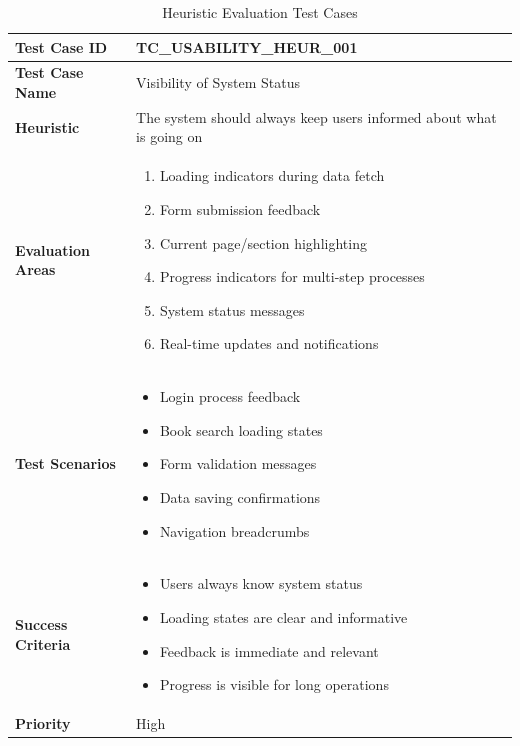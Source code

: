 \documentclass[12pt,a4paper]{article}
\begin{document}
\begin{longtable}{|p{3cm}|p{12cm}|}
\caption{Heuristic Evaluation Test Cases} \\
\hline
\rowcolor{lightgray}
\textbf{Test Case ID} & \textbf{TC\_USABILITY\_HEUR\_001} \\
\hline
\textbf{Test Case Name} & Visibility of System Status \\
\hline
\textbf{Heuristic} & The system should always keep users informed about what is going on \\
\hline
\textbf{Evaluation Areas} & 
\begin{enumerate}[nosep]
    \item Loading indicators during data fetch
    \item Form submission feedback
    \item Current page/section highlighting
    \item Progress indicators for multi-step processes
    \item System status messages
    \item Real-time updates and notifications
\end{enumerate} \\
\hline
\textbf{Test Scenarios} & 
\begin{itemize}[nosep]
    \item Login process feedback
    \item Book search loading states
    \item Form validation messages
    \item Data saving confirmations
    \item Navigation breadcrumbs
\end{itemize} \\
\hline
\textbf{Success Criteria} & 
\begin{itemize}[nosep]
    \item Users always know system status
    \item Loading states are clear and informative
    \item Feedback is immediate and relevant
    \item Progress is visible for long operations
\end{itemize} \\
\hline
\textbf{Priority} & High \\
\hline
\end{longtable}
\end{document}
